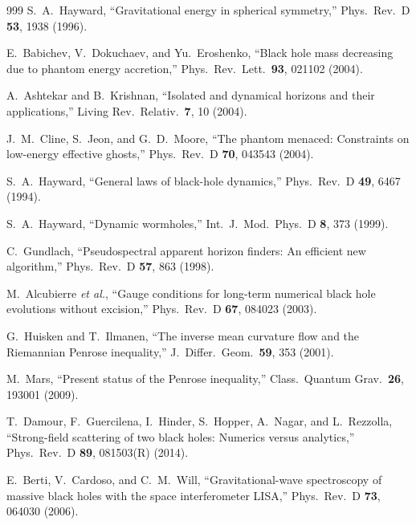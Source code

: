\documentclass[twocolumn,floatfix,aps,prd,superscriptaddress,nofootinbib]{revtex4-2}
\begin{document}
\begin{thebibliography}{999}
S.~A.~Hayward,
\newblock ``Gravitational energy in spherical symmetry,''
\newblock Phys.\ Rev.\ D \textbf{53}, 1938 (1996).

E.~Babichev, V.~Dokuchaev, and Yu.~Eroshenko,
\newblock ``Black hole mass decreasing due to phantom energy accretion,''
\newblock Phys.\ Rev.\ Lett.\ \textbf{93}, 021102 (2004).


A.~Ashtekar and B.~Krishnan,
\newblock ``Isolated and dynamical horizons and their applications,''
\newblock Living Rev.\ Relativ.\ \textbf{7}, 10 (2004).

J.~M.~Cline, S.~Jeon, and G.~D.~Moore,
\newblock ``The phantom menaced: Constraints on low-energy effective ghosts,''
\newblock Phys.\ Rev.\ D \textbf{70}, 043543 (2004).

S.~A.~Hayward,
\newblock ``General laws of black-hole dynamics,''
\newblock Phys.\ Rev.\ D \textbf{49}, 6467 (1994).

S.~A.~Hayward,
\newblock ``Dynamic wormholes,''
\newblock Int.\ J.\ Mod.\ Phys.\ D \textbf{8}, 373 (1999).

C.~Gundlach,
\newblock ``Pseudospectral apparent horizon finders: An efficient new algorithm,''
\newblock Phys.\ Rev.\ D \textbf{57}, 863 (1998).

M.~Alcubierre \emph{et al.},
\newblock ``Gauge conditions for long-term numerical black hole evolutions without excision,''
\newblock Phys.\ Rev.\ D \textbf{67}, 084023 (2003).

G.~Huisken and T.~Ilmanen,
\newblock ``The inverse mean curvature flow and the Riemannian Penrose inequality,''
\newblock J.\ Differ.\ Geom.\ \textbf{59}, 353 (2001).

M.~Mars,
\newblock ``Present status of the Penrose inequality,''
\newblock Class.\ Quantum Grav.\ \textbf{26}, 193001 (2009).

T.~Damour, F.~Guercilena, I.~Hinder, S.~Hopper, A.~Nagar, and L.~Rezzolla,
\newblock ``Strong-field scattering of two black holes: Numerics versus analytics,''
\newblock Phys.\ Rev.\ D \textbf{89}, 081503(R) (2014).

E.~Berti, V.~Cardoso, and C.~M.~Will,
\newblock ``Gravitational-wave spectroscopy of massive black holes with the space interferometer LISA,''
\newblock Phys.\ Rev.\ D \textbf{73}, 064030 (2006).


\end{thebibliography}
\end{document}
